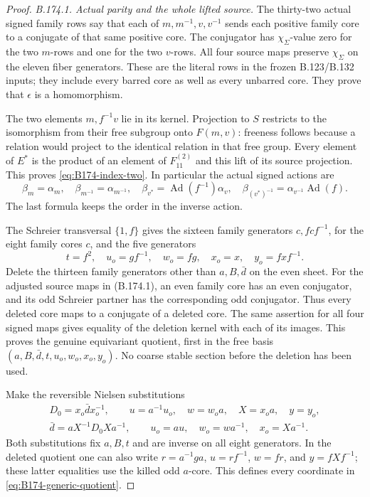 \begin{proof}
\emph{B.174.1. Actual parity and the whole lifted source.}
The thirty-two actual signed family rows say that each of
\(m,m^{-1},v,v^{-1}\) sends each positive family core to a conjugate
of that same positive core. The conjugator has \(\chi_\Sigma\)-value
zero for the two \(m\)-rows and one for the two \(v\)-rows.
All four source maps preserve \(\chi_\Sigma\) on the eleven fiber
generators. These are the literal rows in the frozen B.123/B.132
inputs; they include every barred core as well as every unbarred core.
They prove that \(\epsilon\) is a homomorphism.

The two elements \(m,f^{-1}v\) lie in its kernel. Projection to
\(S\) restricts to the isomorphism from their free subgroup onto
\(F(m,v)\): freeness follows because a relation would project to
the identical relation in that free group. Every element of \(E^*\)
is the product of an element of \(F_{11}^{(2)}\) and this lift of
its source projection. This proves \eqref{eq:B174-index-two}.
In particular the actual signed actions are
\[
 \beta_m=\alpha_m,\quad \beta_{m^{-1}}=\alpha_{m^{-1}},\quad
 \beta_{v^*}=\operatorname{Ad}(f^{-1})\alpha_v,\quad
 \beta_{(v^*)^{-1}}=\alpha_{v^{-1}}\operatorname{Ad}(f).
 \tag{B.174.1}
\]
The last formula keeps the order in the inverse action.

The Schreier transversal \(\{1,f\}\) gives the sixteen family
generators \(c,fcf^{-1}\), for the eight family cores \(c\), and
the five generators
\[
 t=f^2,\quad u_o=gf^{-1},\quad w_o=fg,\quad x_o=x,
 \quad y_o=fxf^{-1}.
 \tag{B.174.2}
\]
Delete the thirteen family generators other than
\(a,B,\bar d\) on the even sheet. For the adjusted source maps
in (B.174.1), an even family core has an even conjugator, and its
odd Schreier partner has the corresponding odd conjugator.
Thus every deleted core maps to a conjugate of a deleted core.
The same assertion for all four signed maps gives equality of the
deletion kernel with each of its images. This proves the genuine
equivariant quotient, first in the free basis
\((a,B,\bar d,t,u_o,w_o,x_o,y_o)\). No coarse stable section before
the deletion has been used.

Make the reversible Nielsen substitutions
\begin{equation}\label{eq:B174-nielsen}
 \begin{gathered}
 D_0=x_o\bar d x_o^{-1},\qquad
 u=a^{-1}u_o,\quad w=w_o a,\quad X=x_o a,\quad y=y_o,\\
 \bar d=aX^{-1}D_0Xa^{-1},\qquad
 u_o=au,\quad w_o=wa^{-1},\quad x_o=Xa^{-1}.
 \end{gathered}
\end{equation}
Both substitutions fix \(a,B,t\) and are inverse on all eight
generators. In the deleted quotient one can also write
\(r=a^{-1}ga\), \(u=rf^{-1}\), \(w=fr\), and
\(y=fXf^{-1}\); these latter equalities use the killed odd
\(a\)-core. This defines every coordinate in
\eqref{eq:B174-generic-quotient}.


\end{proof}
